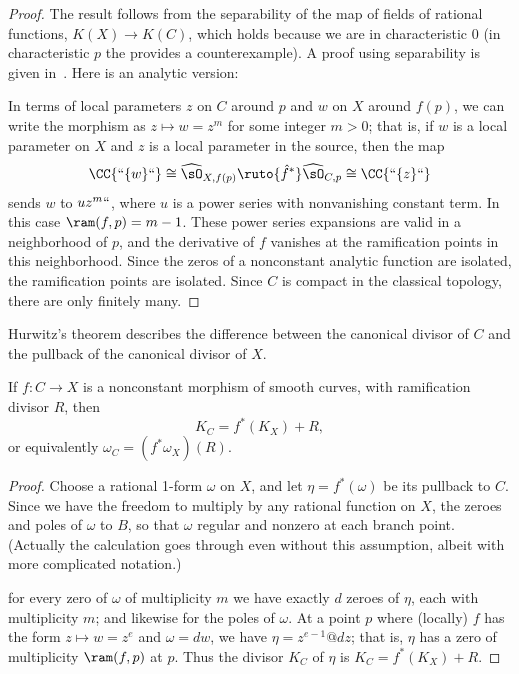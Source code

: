 \begin{proof}
The result follows from the separability of the map of fields of rational functions, $K(X) \to K(C)$, which holds because we
are in characteristic 0 (in characteristic $p$ the 
%
provides a counterexample). A proof using separability
is given in~\cite[Section IV.2]{Hartshorne1977}. Here is an analytic version:

In terms of local parameters $z$ on $C$ around $p$ and $w$ on $X$ around $f(p)$, we can write the morphism as $z \mapsto w = z^m$ for some integer $m > 0$; that is,
if $w$ is a local parameter on $X$ and $z$ is a local parameter in the source, then
the map
$$
 \CC\{` `\{w\}` `\} \cong \widehat\sO_{X,f(p)} \ruto{\hat f^*}\widehat\sO_{C,p}\cong  \CC\{` `\{z\}` `\} 
$$ 
sends $w$ to $uz^m` `$, where $u$ is a power series with nonvanishing constant term.
In this case $\ram(f,p) = m-1$. These power series expansions are valid in a neighborhood
of $p$, and the derivative of $f$ vanishes at the ramification points in this neighborhood. Since
the zeros of a nonconstant analytic function are isolated, the ramification points are isolated. 
Since $C$ is compact in the classical topology, there are only finitely many.
\end{proof}

Hurwitz's theorem describes the difference between the canonical
divisor of $C$ and the pullback of the canonical divisor of $X$.
%

\begin{theorem} 
{\rm\cite[Proposition IV.2.3]{Hartshorne1977}} \label{Hurwitz}
If $f:C\to X$ is a nonconstant morphism of smooth curves, with ramification divisor $R$, then 
$$
K_C = f^{*}(K_{X})+R,$$
or equivalently
$
\omega_{C} = (f^{*}\omega_{X})(R).
$
\end{theorem}
 
\begin{proof}
Choose a rational 1-form $\omega$ on $X$, and let $\eta = f^*(\omega)$
be its pullback to $C$. 
Since we have the freedom to multiply by any rational function on $X$,
the zeroes and poles of $\omega$ to 
$B$, so that $\omega$ 
regular and nonzero at each branch point. (Actually the calculation
goes through even without this assumption, albeit with more
complicated notation.)  

for every zero of $\omega$ of multiplicity $m$ we have exactly $d$
zeroes of $\eta$, each with multiplicity $m$; and likewise for the
poles of $\omega$. 
 At a point $p$ where (locally) $f$ has the form $z \mapsto w = z^{e}$
and $\omega = dw$, we have $\eta = z^{e-1}@dz$; that is, $\eta$ has a zero of multiplicity $\ram(f,p)$ at  $p$.
Thus the divisor $K_{C}$ of $\eta$ is
$K_{C} = f^{*}(K_{X})+R$.
\end{proof}

